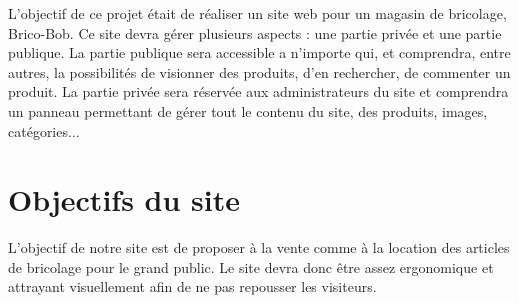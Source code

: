 L'objectif de ce projet était de réaliser un site web pour un magasin de bricolage, Brico-Bob.  Ce site devra gérer plusieurs aspects : une partie privée et une partie publique. La partie publique sera accessible a n'importe qui, et comprendra, entre autres, la possibilités de visionner des produits, d'en rechercher, de commenter un produit. La partie privée sera réservée aux administrateurs du site et comprendra un panneau permettant de gérer tout le contenu du site, des produits, images, catégories...  
		\section{Objectifs du site}
		L'objectif de notre site est de proposer à la vente comme à la location des articles de bricolage pour le grand public.  Le site devra donc être assez ergonomique et  attrayant visuellement afin de ne pas repousser les visiteurs.\\
		
